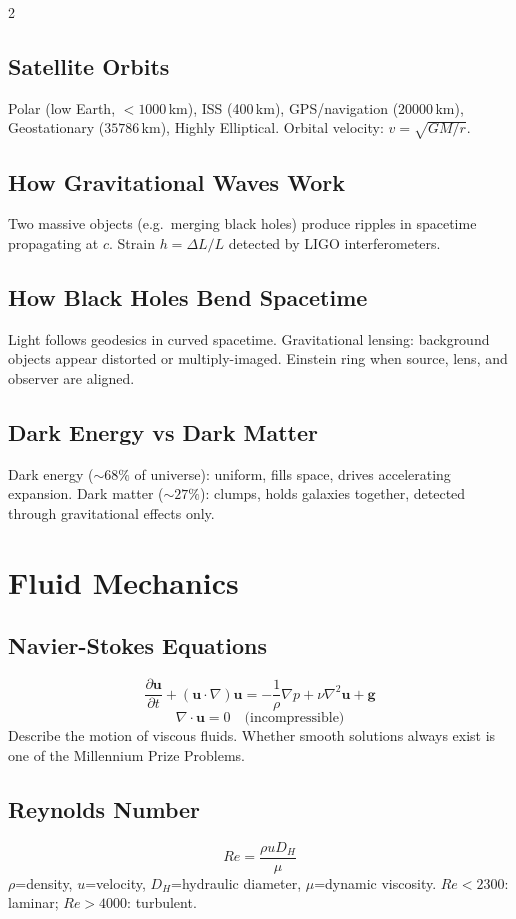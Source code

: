 \documentclass[10pt,a4paper]{article}
\begin{document}
\begin{multicols}{2}
\subsection{Satellite Orbits}
Polar (low Earth, $<1000$\,km), ISS (400\,km), GPS/navigation ($20000$\,km), Geostationary ($35786$\,km), Highly Elliptical. Orbital velocity: $v = \sqrt{GM/r}$.

\subsection{How Gravitational Waves Work}
Two massive objects (e.g.\ merging black holes) produce ripples in spacetime propagating at $c$. Strain $h = \Delta L / L$ detected by LIGO interferometers.

\subsection{How Black Holes Bend Spacetime}
Light follows geodesics in curved spacetime. Gravitational lensing: background objects appear distorted or multiply-imaged. Einstein ring when source, lens, and observer are aligned.

\subsection{Dark Energy vs Dark Matter}
Dark energy ($\sim68\%$ of universe): uniform, fills space, drives accelerating expansion. Dark matter ($\sim27\%$): clumps, holds galaxies together, detected through gravitational effects only.

\section{Fluid Mechanics}

\subsection{Navier-Stokes Equations}
\[
\frac{\partial\mathbf{u}}{\partial t} + (\mathbf{u}\cdot\nabla)\mathbf{u} = -\frac{1}{\rho}\nabla p + \nu\nabla^2\mathbf{u} + \mathbf{g}
\]
\[
\nabla\cdot\mathbf{u} = 0 \quad \text{(incompressible)}
\]
Describe the motion of viscous fluids. Whether smooth solutions always exist is one of the Millennium Prize Problems.

\subsection{Reynolds Number}
\[
Re = \frac{\rho u D_H}{\mu}
\]
$\rho$=density, $u$=velocity, $D_H$=hydraulic diameter, $\mu$=dynamic viscosity. $Re < 2300$: laminar; $Re > 4000$: turbulent.


\end{multicols}
\end{document}
